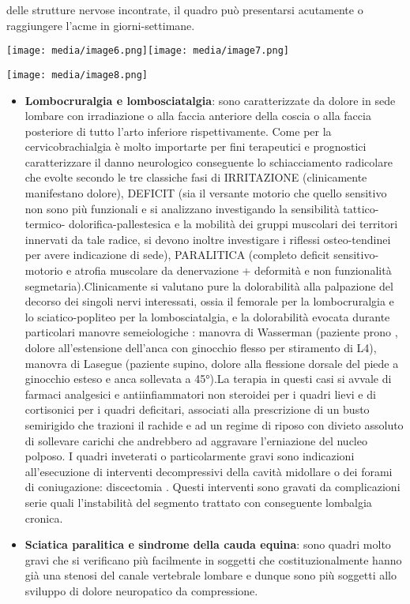 \documentclass[]{article}
\begin{document}
delle strutture nervose incontrate, il quadro può presentarsi acutamente
o raggiungere l'acme in giorni-settimane.

\texttt{[image: media/image6.png]}\texttt{[image: media/image7.png]}

\texttt{[image: media/image8.png]}

\begin{itemize}
\item
  \textbf{Lombocruralgia e lombosciatalgia}: sono caratterizzate da
  dolore in sede lombare con irradiazione o alla faccia anteriore della
  coscia o alla faccia posteriore di tutto l'arto inferiore
  rispettivamente. Come per la cervicobrachialgia è molto importarte per
  fini terapeutici e prognostici caratterizzare il danno neurologico
  conseguente lo schiacciamento radicolare che evolte secondo le tre
  classiche fasi di IRRITAZIONE (clinicamente manifestano dolore),
  DEFICIT (sia il versante motorio che quello sensitivo non sono più
  funzionali e si analizzano investigando la sensibilità
  tattico-termico- dolorifica-pallestesica e la mobilità dei gruppi
  muscolari dei territori innervati da tale radice, si devono inoltre
  investigare i riflessi osteo-tendinei per avere indicazione di sede),
  PARALITICA (completo deficit sensitivo-motorio e atrofia muscolare da
  denervazione + deformità e non funzionalità segmetaria).Clinicamente
  si valutano pure la dolorabilità alla palpazione del decorso dei
  singoli nervi interessati, ossia il femorale per la lombocruralgia e
  lo sciatico-popliteo per la lombosciatalgia, e la dolorabilità evocata
  durante particolari manovre semeiologiche : manovra di Wasserman
  (paziente prono , dolore all'estensione dell'anca con ginocchio flesso
  per stiramento di L4), manovra di Lasegue (paziente supino, dolore
  alla flessione dorsale del piede a ginocchio esteso e anca sollevata a
  45°).La terapia in questi casi si avvale di farmaci analgesici e
  antiinfiammatori non steroidei per i quadri lievi e di cortisonici per
  i quadri deficitari, associati alla prescrizione di un busto
  semirigido che trazioni il rachide e ad un regime di riposo con
  divieto assoluto di sollevare carichi che andrebbero ad aggravare
  l'erniazione del nucleo polposo. I quadri inveterati o particolarmente
  gravi sono indicazioni all'esecuzione di interventi decompressivi
  della cavità midollare o dei forami di coniugazione: discectomia .
  Questi interventi sono gravati da complicazioni serie quali
  l'instabilità del segmento trattato con conseguente lombalgia cronica.
\item
  \textbf{Sciatica paralitica e sindrome della cauda equina}: sono
  quadri molto gravi che si verificano più facilmente in soggetti che
  costituzionalmente hanno già una stenosi del canale vertebrale lombare
  e dunque sono più soggetti allo sviluppo di dolore neuropatico da
  compressione.
\end{itemize}
\end{document}
